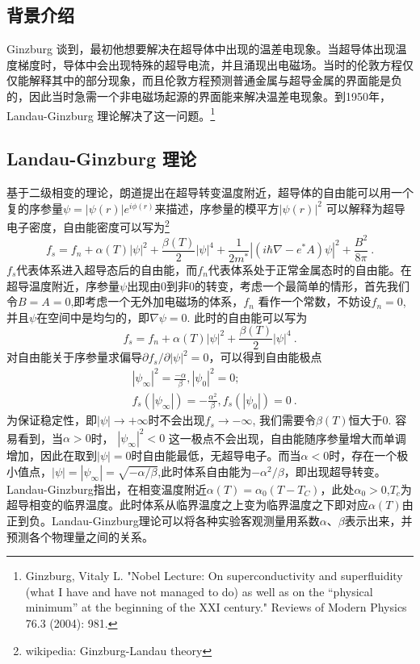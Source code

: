 
\begin{issues}
\issueTODO
\end{issues}

\subsection{背景介绍}
Ginzburg 谈到，最初他想要解决在超导体中出现的温差电现象。当超导体出现温度梯度时，导体中会出现特殊的超导电流，并且涌现出电磁场。当时的伦敦方程仅仅能解释其中的部分现象，而且伦敦方程预测普通金属与超导金属的界面能是负的，因此当时急需一个非电磁场起源的界面能来解决温差电现象。到1950年，Landau-Ginzburg 理论解决了这一问题。\footnote{Ginzburg, Vitaly L. "Nobel Lecture: On superconductivity and superfluidity (what I have and have not managed to do) as well as on the “physical minimum” at the beginning of the XXI century." Reviews of Modern Physics 76.3 (2004): 981.}
\subsection{Landau-Ginzburg 理论}
基于二级相变的理论，朗道提出在超导转变温度附近，超导体的自由能可以用一个复的序参量$\psi = |\psi(r)|e^{i\phi(r)}$来描述，序参量的模平方$|\psi(r)|^2$ 可以解释为超导电子密度，自由能密度可以写为\footnote{wikipedia: Ginzburg-Landau theory}
\begin{equation}
f_s = f_n + \alpha(T) |\psi|^2 + \frac{\beta(T)}{2} |\psi|^4 + \frac{1}{2m^*} \left| \left(i\hbar \nabla - e^* A \right)\psi \right|^2 + \frac{B^2}{8\pi} \label{eq_gl_1}~.
\end{equation}
$f_s$代表体系进入超导态后的自由能，而$f_n$代表体系处于正常金属态时的自由能。在超导温度附近，序参量$\psi$出现由0到非0的转变，考虑一个最简单的情形，首先我们令$B=A = 0$,即考虑一个无外加电磁场的体系，$f_n$ 看作一个常数，不妨设$f_n=0$,并且$\psi$在空间中是均匀的，即$\nabla \psi = 0$. 此时的自由能可以写为
\begin{equation}
f_s = f_n + \alpha(T) |\psi|^2 + \frac{\beta(T)}{2} |\psi|^4 ~.
\end{equation}
对自由能关于序参量求偏导$\partial f_s /\partial |\psi|^2 = 0$，可以得到自由能极点
\begin{align}
&|\psi_{\infty}|^2 = \frac{-\alpha}{\beta},|\psi_0|^2 = 0;\\
&f_s(|\psi_{\infty}|) = -\frac{\alpha^2}{\beta}, f_s(|\psi_0|) = 0 ~.
\end{align}
为保证稳定性，即$|\psi|\rightarrow +\infty$时不会出现$f_s \rightarrow -\infty$, 我们需要令$\beta(T)$恒大于0. 容易看到，当$\alpha>0$时， $|\psi_\infty|^2 <0$ 这一极点不会出现，自由能随序参量增大而单调增加，因此在取到$|\psi|=0$时自由能最低，无超导电子。而当$\alpha<0$时，存在一个极小值点，$|\psi| = |\psi_{\infty}| = \sqrt{-\alpha/\beta}$,此时体系自由能为$-\alpha^2/\beta$，即出现超导转变。Landau-Ginzburg指出，在相变温度附近$\alpha(T) = \alpha_0 (T - T_C)$，此处$\alpha_0 > 0$,$T_c$为超导相变的临界温度。此时体系从临界温度之上变为临界温度之下即对应$\alpha(T)$由正到负。Landau-Ginzburg理论可以将各种实验客观测量用系数$\alpha$、$\beta$表示出来，并预测各个物理量之间的关系。
